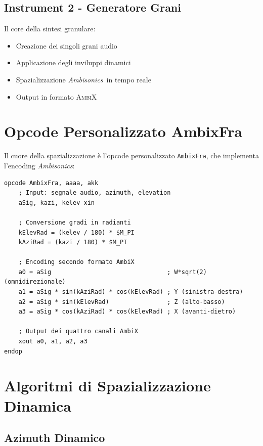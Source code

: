 \documentclass[a4paper,11pt,openany]{book}
\newcommand{\ambisonics}{\textit{Ambisonics}}
\newcommand{\ambix}{\textsc{AmbiX}}
\begin{document}
\subsection{Instrument 2 - Generatore Grani}

Il core della sintesi granulare:

\begin{itemize}
    \item Creazione dei singoli grani audio
    \item Applicazione degli inviluppi dinamici
    \item Spazializzazione \ambisonics\ in tempo reale
    \item Output in formato \ambix
\end{itemize}

\section{Opcode Personalizzato AmbixFra}

Il cuore della spazializzazione è l'opcode personalizzato \texttt{AmbixFra}, che implementa l'encoding \ambisonics:

\begin{lstlisting}[caption={Implementazione opcode AmbixFra}, label={lst:ambixfra}]
opcode AmbixFra, aaaa, akk
    ; Input: segnale audio, azimuth, elevation
    aSig, kazi, kelev xin
    
    ; Conversione gradi in radianti
    kElevRad = (kelev / 180) * $M_PI
    kAziRad = (kazi / 180) * $M_PI

    ; Encoding secondo formato AmbiX
    a0 = aSig                                ; W*sqrt(2) (omnidirezionale)
    a1 = aSig * sin(kAziRad) * cos(kElevRad) ; Y (sinistra-destra)
    a2 = aSig * sin(kElevRad)                ; Z (alto-basso)
    a3 = aSig * cos(kAziRad) * cos(kElevRad) ; X (avanti-dietro)

    ; Output dei quattro canali AmbiX
    xout a0, a1, a2, a3
endop
\end{lstlisting}

\section{Algoritmi di Spazializzazione Dinamica}

\subsection{Azimuth Dinamico}
\end{document}
